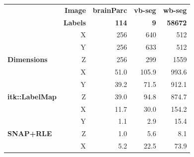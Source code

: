 \documentclass{InsightArticle}
\begin{document}
\begin{table}[h]
	\centering
		\begin{tabular}{lrrrr}
																																& \textbf{Image}           & \textbf{brainParc}          & \textbf{vb-seg}             & \textbf{wb-seg}              \\
		\multirow{-2}{*}{}                  												& \textbf{Labels}          & \textbf{114}                & \textbf{9}                  & \textbf{58672}               \\
																																& X                        & 256                         & 640                         & 512                          \\
																																& Y                        & 256                         & 633                         & 512                          \\
		\multirow{-3}{*}{\textbf{Dimensions}}                        & Z                        & 256                         & 299                         & 1559                         \\
																																& X                        & 51.0                        & 105.9                       & 993.6                        \\
																																& Y                        & 39.2                        & 71.5                        & 912.1                        \\
		\multirow{-3}{*}{\textbf{itk::LabelMap}}                     & Z                        & 39.0                        & 94.8                        & 874.7                        \\
		{\color[HTML]{036400} }                                      & {\color[HTML]{036400} X} & {\color[HTML]{036400} 11.7} & {\color[HTML]{036400} 30.0} & {\color[HTML]{036400} 154.2} \\
		{\color[HTML]{036400} }                                      & {\color[HTML]{036400} Y} & {\color[HTML]{036400} 1.1}  & {\color[HTML]{036400} 2.9}  & {\color[HTML]{036400} 15.4}  \\
		\multirow{-3}{*}{{\color[HTML]{036400} \textbf{SNAP+RLE}}}   & {\color[HTML]{036400} Z} & {\color[HTML]{036400} 1.0}  & {\color[HTML]{036400} 5.6}  & {\color[HTML]{036400} 8.1}   \\
		{\color[HTML]{9A0000} }                                      & {\color[HTML]{9A0000} X} & {\color[HTML]{9A0000} 5.2}  & {\color[HTML]{9A0000} 22.5} & {\color[HTML]{9A0000} 73.9}  \\

\end{tabular}
\end{table}
\end{document}
